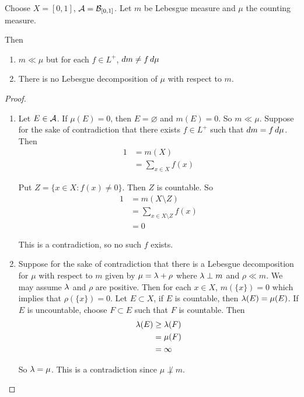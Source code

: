 \documentclass{book}
\begin{document}
	
	\begin{ex}  
		Choose $X = [0,1]$, $\mathcal{A} = \mathcal{B}_{[0,1]}$. Let $m$ be Lebesgue measure and $\mu$ the counting measure. 
		
		Then 
		\begin{enumerate}
			\item $m \ll \mu$ but for each $f \in L^+$, $dm \neq f \, d \mu$
			\item There is no Lebesgue decomposition of $\mu$ with respect to $m$.
		\end{enumerate}
	\end{ex}
	
	\begin{proof}
		\begin{enumerate}
			\item Let $E \in \mathcal{A}$. If $\mu(E) = 0$, then $E = \varnothing$ and $m(E) = 0$. So $m \ll \mu$. Suppose for the sake of contradiction that there exists $f \in L^+$ such that $dm = f \, d \mu$. Then 
			\begin{align*}
				1
				&= m(X) \\
				&= \sum_{x \in X} f(x)
			\end{align*}
			
			Put $Z = \{x \in X: f(x) \neq 0 \}$. Then $Z$ is countable. So 
			\begin{align*}
				1
				&= m(X \setminus Z) \\
				&= \sum_{x \in X \setminus Z} f(x)\\
				&= 0
			\end{align*}
			
			This is a contradiction, so no such $f$ exists.
			
			\item Suppose for the sake of contradiction that there is a Lebesgue decomposition for $\mu$ with respect to $m$ given by $\mu = \lambda + \rho$ where $\lambda \perp m$ and $\rho \ll m$. We may assume $\lambda$ and $\rho$ are positive. Then for each $x \in X$, $m(\{x\})=0$ which implies that $\rho(\{x\}) = 0$. Let $E \subset X$, if $E$ is countable, then $\lambda(E) = \mu(E)$. If $E$ is uncountable, choose $F \subset E$ such that $F$ is countable. Then 
			\begin{align*}
				\lambda(E) 
				& \geq \lambda(F) \\
				& = \mu(F) \\
				&= \infty
			\end{align*}
			
			So $\lambda = \mu$. This is a contradiction since $\mu \not \perp m$.
		\end{enumerate}
	\end{proof}
\end{document}
